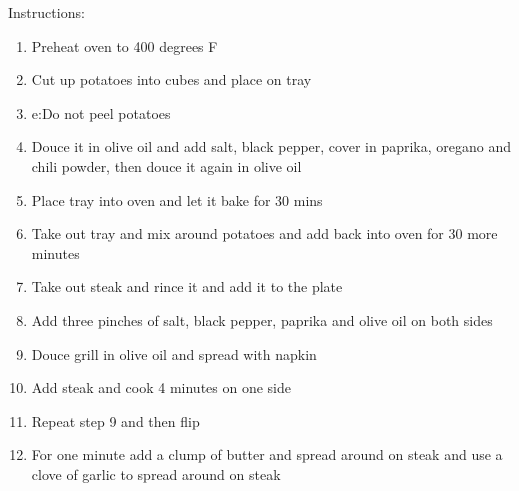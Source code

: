 \documentclass{article}
\begin{document}
Instructions:
\begin{enumerate}
    \item Preheat oven to 400 degrees F
    \item Cut up potatoes into cubes and place on tray
    \item e:Do not peel potatoes 
    \item Douce it in olive oil and add salt, black pepper, cover in paprika, oregano and chili powder, then douce it again in olive oil
    \item Place tray into oven and let it bake for 30 mins
    \item Take out tray and mix around potatoes and add back into oven for 30 more minutes
    \item Take out steak and rince it and add it to the plate
    \item Add three pinches of salt, black pepper, paprika and olive oil on both sides
    \item Douce grill in olive oil and spread with napkin
    \item Add steak and cook 4 minutes on one side 
    \item Repeat step 9 and then flip 
    \item For one minute add a clump of butter and spread around on steak and use a clove of garlic to spread around on steak

\end{enumerate}
\end{document}
